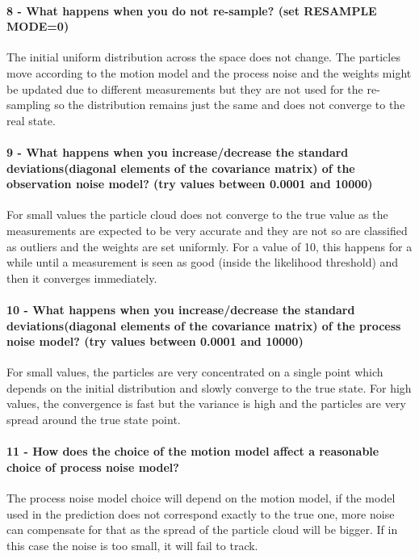 \documentclass[12pt]{article}
\begin{document}
\paragraph{8 - What happens when you do not re-sample? (set RESAMPLE MODE=0)} The initial uniform distribution across the space does not change. The particles move according to the motion model and the process noise and the weights might be updated due to different measurements but they are not used for the re-sampling so the distribution remains just the same and does not converge to the real state.

\paragraph{9 - What happens when you increase/decrease the standard deviations(diagonal elements of the covariance matrix) of the observation noise model? (try values between 0.0001 and 10000)}
For small values the particle cloud does not converge to the true value as the measurements are expected to be very accurate and they are not so are classified as outliers and the weights are set uniformly. For a value of 10, this happens for a while until a measurement is seen as good (inside the likelihood threshold) and then it converges immediately.

\paragraph{10 - What happens when you increase/decrease the standard deviations(diagonal elements of the covariance matrix) of the process noise model? (try values between 0.0001 and 10000)}
For small values, the particles are very concentrated on a single point which depends on the initial distribution and slowly converge to the true state. For high values, the convergence is fast but the variance is high and the particles are very spread around the true state point.

\paragraph{11 - How does the choice of the motion model affect a reasonable choice of process noise model?}
The process noise model choice will depend on the motion model, if the model used in the prediction does not correspond exactly to the true one, more noise can compensate for that as the spread of the particle cloud will be bigger. If in this case the noise is too small, it will fail to track.
\end{document}
